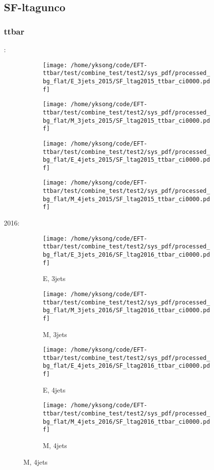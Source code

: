 \documentclass{beamer}
\begin{document}
\subsection{SF-ltagunco}

\begin{frame}
\frametitle{ttbar}
\fontsize{5}{1}:
\begin{figure}
\centering
\begin{subfigure}[b]{0.24\textwidth}
\texttt{[image: /home/yksong/code/EFT-ttbar/test/combine\_test/test2/sys\_pdf/processed\_bg\_flat/E\_3jets\_2015/SF\_ltag2015\_ttbar\_ci0000.pdf]}
\end{subfigure}
\begin{subfigure}[b]{0.24\textwidth}
\texttt{[image: /home/yksong/code/EFT-ttbar/test/combine\_test/test2/sys\_pdf/processed\_bg\_flat/M\_3jets\_2015/SF\_ltag2015\_ttbar\_ci0000.pdf]}
\end{subfigure}
\begin{subfigure}[b]{0.24\textwidth}
\texttt{[image: /home/yksong/code/EFT-ttbar/test/combine\_test/test2/sys\_pdf/processed\_bg\_flat/E\_4jets\_2015/SF\_ltag2015\_ttbar\_ci0000.pdf]}
\end{subfigure}
\begin{subfigure}[b]{0.24\textwidth}
\texttt{[image: /home/yksong/code/EFT-ttbar/test/combine\_test/test2/sys\_pdf/processed\_bg\_flat/M\_4jets\_2015/SF\_ltag2015\_ttbar\_ci0000.pdf]}
\end{subfigure}
\end{figure}
2016:
\begin{figure}
\centering
\begin{subfigure}[b]{0.24\textwidth}
\texttt{[image: /home/yksong/code/EFT-ttbar/test/combine\_test/test2/sys\_pdf/processed\_bg\_flat/E\_3jets\_2016/SF\_ltag2016\_ttbar\_ci0000.pdf]}
\captionsetup{font=tiny}
\caption{E, 3jets}
\end{subfigure}
\begin{subfigure}[b]{0.24\textwidth}
\texttt{[image: /home/yksong/code/EFT-ttbar/test/combine\_test/test2/sys\_pdf/processed\_bg\_flat/M\_3jets\_2016/SF\_ltag2016\_ttbar\_ci0000.pdf]}
\captionsetup{font=tiny}
\caption{M, 3jets}
\end{subfigure}
\begin{subfigure}[b]{0.24\textwidth}
\texttt{[image: /home/yksong/code/EFT-ttbar/test/combine\_test/test2/sys\_pdf/processed\_bg\_flat/E\_4jets\_2016/SF\_ltag2016\_ttbar\_ci0000.pdf]}
\captionsetup{font=tiny}
\caption{E, 4jets}
\end{subfigure}
\begin{subfigure}[b]{0.24\textwidth}
\texttt{[image: /home/yksong/code/EFT-ttbar/test/combine\_test/test2/sys\_pdf/processed\_bg\_flat/M\_4jets\_2016/SF\_ltag2016\_ttbar\_ci0000.pdf]}
\captionsetup{font=tiny}
\caption{M, 4jets}
\end{subfigure}
\end{figure}
\end{frame}
\end{document}
